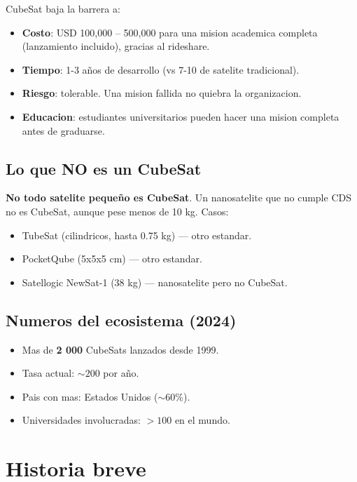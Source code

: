 \documentclass[11pt,a4paper,oneside,openright]{book}
\begin{document}
CubeSat baja la barrera a:
\begin{itemize}[leftmargin=2em]
  \item \textbf{Costo}: USD 100,000 -- 500,000 para una mision academica
        completa (lanzamiento incluido), gracias al rideshare.
  \item \textbf{Tiempo}: 1-3 años de desarrollo (vs 7-10 de satelite tradicional).
  \item \textbf{Riesgo}: tolerable. Una mision fallida no quiebra la
        organizacion.
  \item \textbf{Educacion}: estudiantes universitarios pueden hacer una
        mision completa antes de graduarse.
\end{itemize}

\section{Lo que NO es un CubeSat}

\begin{cuidado}
\textbf{No todo satelite pequeño es CubeSat}. Un nanosatelite que no
cumple CDS no es CubeSat, aunque pese menos de 10 kg. Casos:
\begin{itemize}[leftmargin=1em]
  \item TubeSat (cilindricos, hasta 0.75 kg) --- otro estandar.
  \item PocketQube (5x5x5 cm) --- otro estandar.
  \item Satellogic NewSat-1 (38 kg) --- nanosatelite pero no CubeSat.
\end{itemize}
\end{cuidado}

\section{Numeros del ecosistema (2024)}

\begin{itemize}[leftmargin=2em]
  \item Mas de \textbf{2 000} CubeSats lanzados desde 1999.
  \item Tasa actual: $\sim 200$ por año.
  \item Pais con mas: Estados Unidos ($\sim 60\%$).
  \item Universidades involucradas: $> 100$ en el mundo.
\end{itemize}

\chapter{Historia breve}
\label{ch:historia}
\end{document}
